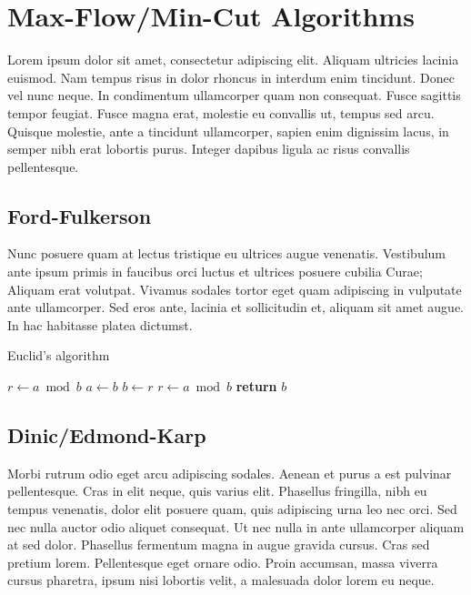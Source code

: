 
\section{Max-Flow/Min-Cut Algorithms}
\label{sec:MaxFlowMinCutAlgoithms}

Lorem ipsum dolor sit amet, consectetur adipiscing elit. Aliquam ultricies lacinia euismod. Nam tempus risus in dolor rhoncus in interdum enim tincidunt. Donec vel nunc neque. In condimentum ullamcorper quam non consequat. Fusce sagittis tempor feugiat. Fusce magna erat, molestie eu convallis ut, tempus sed arcu. Quisque molestie, ante a tincidunt ullamcorper, sapien enim dignissim lacus, in semper nibh erat lobortis purus. Integer dapibus ligula ac risus convallis pellentesque.

\subsection{Ford-Fulkerson}

Nunc posuere quam at lectus tristique eu ultrices augue venenatis. Vestibulum ante ipsum primis in faucibus orci luctus et ultrices posuere cubilia Curae; Aliquam erat volutpat. Vivamus sodales tortor eget quam adipiscing in vulputate ante ullamcorper. Sed eros ante, lacinia et sollicitudin et, aliquam sit amet augue. In hac habitasse platea dictumst.

\begin{algorithm}
	\caption{Euclid’s algorithm}\label{alg:euclid}
	\begin{algorithmic}[1]
		\State $r\gets a\bmod b$
		\State $a\gets b$
		\State $b\gets r$
		\State $r\gets a\bmod b$
		\EndWhile\label{euclidendwhile}
		\State \textbf{return} $b$
		\EndProcedure
	\end{algorithmic}
\end{algorithm}


\subsection{Dinic/Edmond-Karp}
Morbi rutrum odio eget arcu adipiscing sodales. Aenean et purus a est pulvinar pellentesque. Cras in elit neque, quis varius elit. Phasellus fringilla, nibh eu tempus venenatis, dolor elit posuere quam, quis adipiscing urna leo nec orci. Sed nec nulla auctor odio aliquet consequat. Ut nec nulla in ante ullamcorper aliquam at sed dolor. Phasellus fermentum magna in augue gravida cursus. Cras sed pretium lorem. Pellentesque eget ornare odio. Proin accumsan, massa viverra cursus pharetra, ipsum nisi lobortis velit, a malesuada dolor lorem eu neque.

